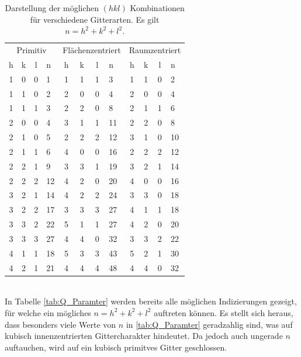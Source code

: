 \documentclass[a4paper,twoside,final]{article}
\begin{document}
\begin{table}[ht]
	\centering
	\caption{Darstellung der möglichen $(hkl)$ Kombinationen für verschiedene Gitterarten. Es gilt $n = h^2+k^2+l^2$.}
	\label{tab:Indizierung}
	\begin{tabular}{c c c l c c c l c c c l}
		\toprule
      \multicolumn{4}{c}{Primitiv} & \multicolumn{4}{c}{Flächenzentriert} & \multicolumn{4}{c}{Raumzentriert}\\
      \cmidrule(lr){1-4}\cmidrule(lr){5-8}\cmidrule(lr){9-12}
      h & k & l & n & h & k & l & n & h & k & l & n \\
      \midrule
      1 & 0 & 0 & 1   & 1 & 1 & 1 & 3   & 1 & 1 & 0 & 2   \\
      1 & 1 & 0 & 2   & 2 & 0 & 0 & 4   & 2 & 0 & 0 & 4   \\
      1 & 1 & 1 & 3   & 2 & 2 & 0 & 8   & 2 & 1 & 1 & 6   \\
      2 & 0 & 0 & 4   & 3 & 1 & 1 & 11  & 2 & 2 & 0 & 8   \\
      2 & 1 & 0 & 5   & 2 & 2 & 2 & 12  & 3 & 1 & 0 & 10  \\
      2 & 1 & 1 & 6   & 4 & 0 & 0 & 16  & 2 & 2 & 2 & 12  \\
      2 & 2 & 1 & 9   & 3 & 3 & 1 & 19  & 3 & 2 & 1 & 14  \\
      2 & 2 & 2 & 12  & 4 & 2 & 0 & 20  & 4 & 0 & 0 & 16  \\
      3 & 2 & 1 & 14  & 4 & 2 & 2 & 24  & 3 & 3 & 0 & 18  \\
      3 & 2 & 2 & 17  & 3 & 3 & 3 & 27  & 4 & 1 & 1 & 18  \\
      3 & 3 & 2 & 22  & 5 & 1 & 1 & 27  & 4 & 2 & 0 & 20  \\
      3 & 3 & 3 & 27  & 4 & 4 & 0 & 32  & 3 & 3 & 2 & 22  \\
      4 & 1 & 1 & 18  & 5 & 3 & 3 & 43  & 5 & 2 & 1 & 30  \\
      4 & 2 & 1 & 21  & 4 & 4 & 4 & 48  & 4 & 4 & 0 & 32
	\end{tabular}
\end{table}\\
In Tabelle \ref{tab:Q_Paramter} werden bereits alle möglichen Indizierungen gezeigt, für welche ein mögliches $n = h^2+ k^2 +l^2$ auftreten können. Es stellt sich heraus, dass besonders viele Werte von $n$ in \ref{tab:Q_Paramter} geradzahlig sind, was auf kubisch innenzentrierten Gittercharakter hindeutet. Da jedoch auch ungerade $n$ auftauchen, wird auf ein kubisch primitves Gitter geschlossen.
\end{document}
